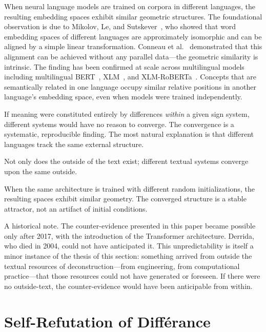 \documentclass[a4paper,twocolumn,11pt]{article}
\begin{document}
When neural language models are trained on corpora in different languages, the resulting embedding spaces exhibit similar geometric structures. The foundational observation is due to Mikolov, Le, and Sutskever~\cite{Mikolov2013}, who showed that word embedding spaces of different languages are approximately isomorphic and can be aligned by a simple linear transformation. Conneau et al.~\cite{Conneau2018} demonstrated that this alignment can be achieved without any parallel data---the geometric similarity is intrinsic. The finding has been confirmed at scale across multilingual models including multilingual BERT~\cite{Devlin2019,Pires2019}, XLM~\cite{Lample2019}, and XLM-RoBERTa~\cite{Conneau2020}. Concepts that are semantically related in one language occupy similar relative positions in another language's embedding space, even when models were trained independently.

If meaning were constituted entirely by differences \emph{within} a given sign system, different systems would have no reason to converge. The convergence is a systematic, reproducible finding. The most natural explanation is that different languages track the same external structure.

Not only does the outside of the text exist; different textual systems converge upon the same outside.

When the same architecture is trained with different random initializations, the resulting spaces exhibit similar geometry. The converged structure is a stable attractor, not an artifact of initial conditions.

A historical note. The counter-evidence presented in this paper became possible only after 2017, with the introduction of the Transformer architecture. Derrida, who died in 2004, could not have anticipated it. This unpredictability is itself a minor instance of the thesis of this section: something arrived from outside the textual resources of deconstruction---from engineering, from computational practice---that those resources could not have generated or foreseen. If there were no outside-text, the counter-evidence would have been anticipable from within.



\section{Self-Refutation of Diff\'erance}
\label{sec:self-refutation}
\end{document}
